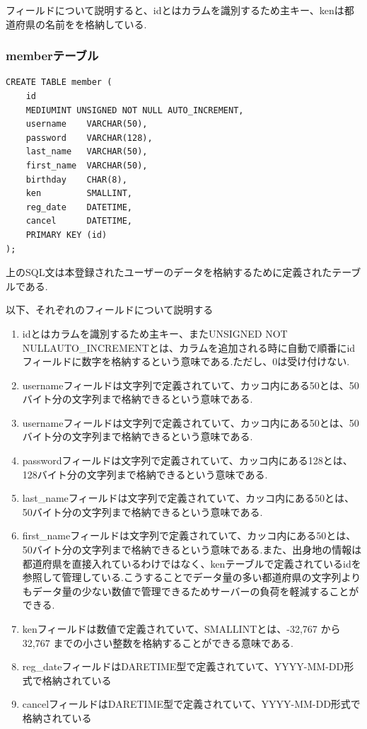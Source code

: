 \documentclass[submit,techrep]{ipsj}
\begin{document}
フィールドについて説明すると、idとはカラムを識別するため主キー、kenは都道府県の名前をを格納している.

\subsubsection{memberテーブル}
\begin{verbatim}
CREATE TABLE member (
    id          
    MEDIUMINT UNSIGNED NOT NULL AUTO_INCREMENT,
    username   	VARCHAR(50),
    password   	VARCHAR(128),
    last_name  	VARCHAR(50),
    first_name 	VARCHAR(50),
    birthday   	CHAR(8),
    ken         SMALLINT,
    reg_date   	DATETIME,
    cancel      DATETIME,
    PRIMARY KEY (id)
);
\end{verbatim}
上のSQL文は本登録されたユーザーのデータを格納するために定義されたテーブルである.

以下、それぞれのフィールドについて説明する

\begin{enumerate}
  \item idとはカラムを識別するため主キー、またUNSIGNED NOT NULLAUTO\_INCREMENTとは、カラムを追加される時に自動で順番にidフィールドに数字を格納するという意味である.ただし、0は受け付けない.
  \item usernameフィールドは文字列で定義されていて、カッコ内にある50とは、50バイト分の文字列まで格納できるという意味である.
 \item usernameフィールドは文字列で定義されていて、カッコ内にある50とは、50バイト分の文字列まで格納できるという意味である.
  \item passwordフィールドは文字列で定義されていて、カッコ内にある128とは、128バイト分の文字列まで格納できるという意味である.
   \item last\_nameフィールドは文字列で定義されていて、カッコ内にある50とは、50バイト分の文字列まで格納できるという意味である.
    \item first\_nameフィールドは文字列で定義されていて、カッコ内にある50とは、50バイト分の文字列まで格納できるという意味である.また、出身地の情報は都道府県を直接入れているわけではなく、kenテーブルで定義されているidを参照して管理している.こうすることでデータ量の多い都道府県の文字列よりもデータ量の少ない数値で管理できるためサーバーの負荷を軽減することができる.

  \item kenフィールドは数値で定義されていて、SMALLINTとは、-32,767 から 32,767 までの小さい整数を格納することができる意味である.
 \item reg\_dateフィールドはDARETIME型で定義されていて、YYYY-MM-DD形式で格納されている
 \item cancelフィールドはDARETIME型で定義されていて、YYYY-MM-DD形式で格納されている  \end{enumerate}
\end{document}
